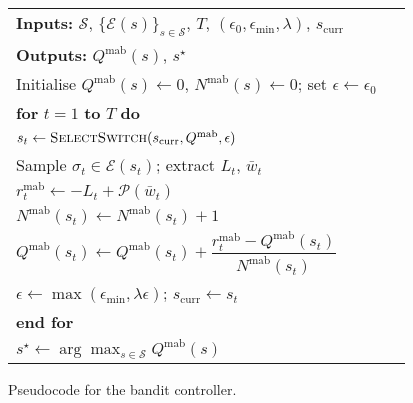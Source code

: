 \documentclass[journal]{IEEEtranTIE}
\begin{document}
\begin{figure}[t]
  \centering
  \begingroup\footnotesize
  \begin{tabular}{p{0.95\linewidth}}
    \toprule
    \textbf{Inputs:} $\mathcal{S}$, $\{\mathcal{E}(s)\}_{s\in\mathcal{S}}$, $T$, $(\epsilon_0,\epsilon_{\min},\lambda)$, $s_{\mathrm{curr}}$ \\
    \textbf{Outputs:} $Q^{\mathrm{mab}}(s)$, $s^\star$ \\
    \midrule
    Initialise $Q^{\mathrm{mab}}(s)\leftarrow 0$, $N^{\mathrm{mab}}(s)\leftarrow 0$; set $\epsilon\leftarrow\epsilon_0$ \\
    \textbf{for} $t=1$ \textbf{to} $T$ \textbf{do} \\
    \quad $s_t \leftarrow \textsc{SelectSwitch}(s_{\mathrm{curr}}, Q^{\mathrm{mab}}, \epsilon)$ \\
    \quad Sample $\sigma_t \in \mathcal{E}(s_t)$; extract $L_t$, $\bar{w}_t$ \\
    \quad $r_t^{\mathrm{mab}} \leftarrow -L_t + \mathcal{P}(\bar{w}_t)$ \\
    \quad $N^{\mathrm{mab}}(s_t) \leftarrow N^{\mathrm{mab}}(s_t)+1$ \\
    \quad $Q^{\mathrm{mab}}(s_t) \leftarrow Q^{\mathrm{mab}}(s_t) + \dfrac{r_t^{\mathrm{mab}} - Q^{\mathrm{mab}}(s_t)}{N^{\mathrm{mab}}(s_t)}$ \\
    \quad $\epsilon \leftarrow \max(\epsilon_{\min}, \lambda \epsilon)$; $s_{\mathrm{curr}} \leftarrow s_t$ \\
    \textbf{end for} \\
    $s^\star \leftarrow \arg\max_{s\in\mathcal{S}} Q^{\mathrm{mab}}(s)$ \\
    \bottomrule
  \end{tabular}
  \endgroup
  \caption{Pseudocode for the bandit controller.}
  \label{fig:mab-pseudocode}
\end{figure}
\end{document}

